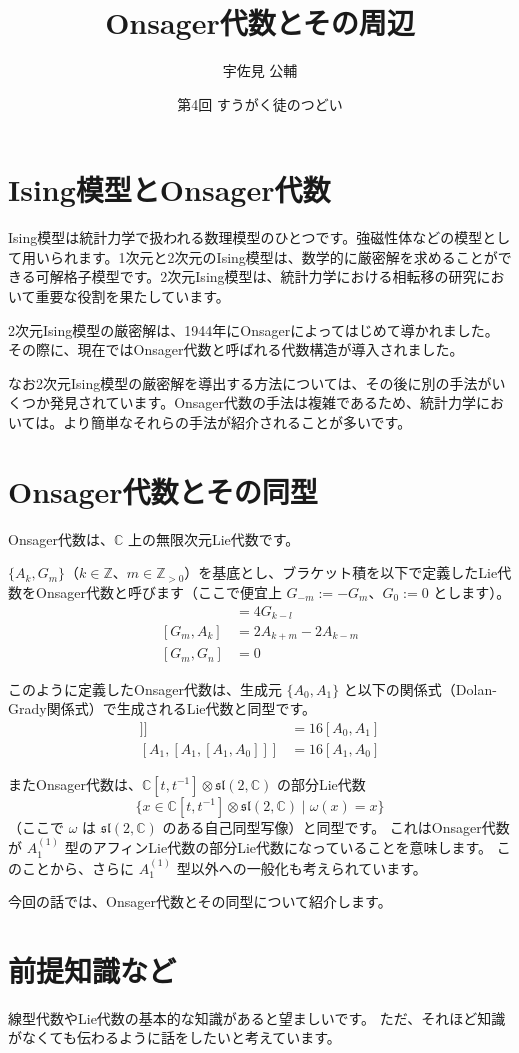 \documentclass{jlreq}
\title{Onsager代数とその周辺}
\author{宇佐見 公輔}
\date{第4回 すうがく徒のつどい}
\begin{document}
\maketitle

\section*{Ising模型とOnsager代数}

Ising模型は統計力学で扱われる数理模型のひとつです。強磁性体などの模型として用いられます。1次元と2次元のIsing模型は、数学的に厳密解を求めることができる可解格子模型です。2次元Ising模型は、統計力学における相転移の研究において重要な役割を果たしています。

2次元Ising模型の厳密解は、1944年にOnsagerによってはじめて導かれました。その際に、現在ではOnsager代数と呼ばれる代数構造が導入されました。

なお2次元Ising模型の厳密解を導出する方法については、その後に別の手法がいくつか発見されています。Onsager代数の手法は複雑であるため、統計力学においては。より簡単なそれらの手法が紹介されることが多いです。

\section*{Onsager代数とその同型}

Onsager代数は、$\mathbb{C}$ 上の無限次元Lie代数です。

$\{A_k,G_m\}$（$k\in\mathbb{Z}$、$m\in\mathbb{Z}_{>0}$）を基底とし、ブラケット積を以下で定義したLie代数をOnsager代数と呼びます（ここで便宜上 $G_{-m}:=-G_m$、$G_0:=0$ とします）。
\begin{align}
    [A_k,A_l] & =4G_{k-l}          \\
    [G_m,A_k] & =2A_{k+m}-2A_{k-m} \\
    [G_m,G_n] & =0
\end{align}

このように定義したOnsager代数は、生成元 $\{A_0,A_1\}$ と以下の関係式（Dolan-Grady関係式）で生成されるLie代数と同型です。
\begin{align}
    [A_0,[A_0,[A_0,A_1]]] & =16[A_0,A_1] \\
    [A_1,[A_1,[A_1,A_0]]] & =16[A_1,A_0]
\end{align}

またOnsager代数は、$\mathbb{C}[t,t^{-1}]\otimes\mathfrak{sl}(2,\mathbb{C})$ の部分Lie代数
\begin{equation}
    \{ x \in \mathbb{C}[t,t^{-1}] \otimes \mathfrak{sl}(2,\mathbb{C}) \mid \omega(x) = x \}
\end{equation}
（ここで $\omega$ は $\mathfrak{sl}(2,\mathbb{C})$ のある自己同型写像）と同型です。
これはOnsager代数が $A_1^{(1)}$ 型のアフィンLie代数の部分Lie代数になっていることを意味します。
このことから、さらに $A_1^{(1)}$ 型以外への一般化も考えられています。

今回の話では、Onsager代数とその同型について紹介します。

\section*{前提知識など}

線型代数やLie代数の基本的な知識があると望ましいです。
ただ、それほど知識がなくても伝わるように話をしたいと考えています。
\end{document}
